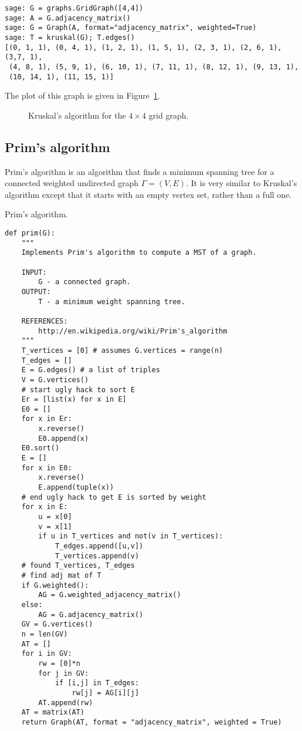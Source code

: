 \begin{lstlisting}
sage: G = graphs.GridGraph([4,4])
sage: A = G.adjacency_matrix()
sage: G = Graph(A, format="adjacency_matrix", weighted=True)
sage: T = kruskal(G); T.edges()
[(0, 1, 1), (0, 4, 1), (1, 2, 1), (1, 5, 1), (2, 3, 1), (2, 6, 1), (3,7, 1),
 (4, 8, 1), (5, 9, 1), (6, 10, 1), (7, 11, 1), (8, 12, 1), (9, 13, 1),
 (10, 14, 1), (11, 15, 1)]
\end{lstlisting}
%
The plot of this graph is given in
Figure~\ref{fig:trees-forests:Kruskal_example}.

\begin{figure}[!htbp]
\centering

\caption{Kruskal's algorithm for the $4\times 4$ grid graph.}
\label{fig:trees-forests:Kruskal_example}
\end{figure}

\subsection{Prim's algorithm}

Prim's algorithm is an algorithm that finds a minimum spanning tree
for a connected weighted
undirected graph $\Gamma=(V,E)$. It is very similar to Kruskal's
algorithm except that it starts with an empty vertex set, rather than
a full one.

\begin{algorithm}[!htpb]

\caption{Prim's algorithm.}
\label{alg:tree-forest:prim}
\end{algorithm}

\begin{lstlisting}
def prim(G):
    """
    Implements Prim's algorithm to compute a MST of a graph.

    INPUT:
        G - a connected graph.
    OUTPUT:
        T - a minimum weight spanning tree.

    REFERENCES:
        http://en.wikipedia.org/wiki/Prim's_algorithm
    """
    T_vertices = [0] # assumes G.vertices = range(n)
    T_edges = []
    E = G.edges() # a list of triples
    V = G.vertices()
    # start ugly hack to sort E
    Er = [list(x) for x in E]
    E0 = []
    for x in Er:
        x.reverse()
        E0.append(x)
    E0.sort()
    E = []
    for x in E0:
        x.reverse()
        E.append(tuple(x))
    # end ugly hack to get E is sorted by weight
    for x in E:
        u = x[0]
        v = x[1]
        if u in T_vertices and not(v in T_vertices):
            T_edges.append([u,v])
            T_vertices.append(v)
    # found T_vertices, T_edges
    # find adj mat of T
    if G.weighted():
        AG = G.weighted_adjacency_matrix()
    else:
        AG = G.adjacency_matrix()
    GV = G.vertices()
    n = len(GV)
    AT = []
    for i in GV:
        rw = [0]*n
        for j in GV:
            if [i,j] in T_edges:
                rw[j] = AG[i][j]
        AT.append(rw)
    AT = matrix(AT)
    return Graph(AT, format = "adjacency_matrix", weighted = True)
\end{lstlisting}

